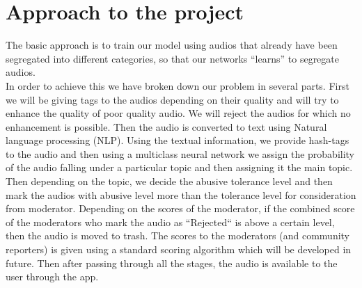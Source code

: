 \documentclass[11pt]{article}
\begin{document}
\section{Approach to the project}
		The basic approach is to train our model using audios that already have been segregated into different categories, so that our networks ``learns'' to segregate audios.\\
		In order to achieve this we have broken down our problem in several parts. First we will be giving tags to the audios depending on their quality and will try to enhance the quality of poor quality audio. We will reject the audios for which no enhancement is possible. Then the audio is converted to text using Natural language processing (NLP). Using the textual information, we provide hash-tags to the audio and then using a multiclass neural network we assign the probability of the audio falling under a particular topic and  then assigning it the main topic. Then depending on the topic, we decide the abusive tolerance level and then mark the audios with abusive level more than the tolerance level for consideration from moderator. Depending on the scores of the moderator, if the combined score of the moderators who mark the audio as ``Rejected`` is above a certain level, then the audio is moved to trash. The scores to the moderators (and community reporters) is given using a standard scoring algorithm which will be developed in future. Then after passing through all the stages, the audio is available to the user through the app.
\end{document}
